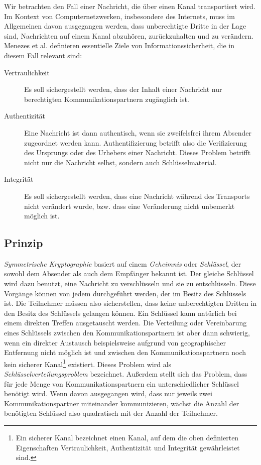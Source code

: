 Wir betrachten den Fall einer Nachricht, die über einen Kanal
transportiert wird. Im Kontext von Computernetzwerken, insbesondere
des Internets, muss im Allgemeinen davon ausgegangen werden, dass
unberechtigte Dritte in der Lage sind, Nachrichten auf einem Kanal
abzuhören, zurückzuhalten und zu verändern. \pagebreak[1] Menezes et
al. \cite{Menezes1996} definieren essentielle Ziele von
Informationssicherheit, die in diesem Fall relevant sind:\
\begin{description}
\item[Vertraulichkeit] Es soll sichergestellt werden, dass der Inhalt
  einer Nachricht nur berechtigten Kommunikationspartnern zugänglich
  ist.
\item[Authentizität] Eine Nachricht ist dann authentisch, wenn sie
  zweifelsfrei ihrem Absender zugeordnet werden
  kann. Authentifizierung betrifft also die Verifizierung des
  Ursprungs oder des Urhebers einer Nachricht. Dieses Problem betrifft
  nicht nur die Nachricht selbst, sondern auch Schlüsselmaterial.
\item[Integrität] Es soll sichergestellt werden, dass eine Nachricht
  während des Transports nicht verändert wurde, bzw. dass eine
  Veränderung nicht unbemerkt möglich ist.
\end{description}

\subsection{Prinzip}
\label{ch:Grundlagen:sec:PublicKeyCrypto:subsec:Prinzip}

\emph{Symmetrische Kryptographie} basiert auf einem \emph{Geheimnis}
oder \emph{Schlüssel}, der sowohl dem Absender als auch dem
Empfänger bekannt ist. Der gleiche Schlüssel wird dazu benutzt,
eine Nachricht zu verschlüsseln und sie zu entschlüsseln. Diese
Vorgänge können von jedem durchgeführt werden, der im Besitz des
Schlüssels ist.  Die Teilnehmer müssen also sicherstellen, dass
keine unberechtigten Dritten in den Besitz des Schlüssels gelangen
können. Ein Schlüssel kann natürlich bei einem direkten Treffen
ausgetauscht werden. Die Verteilung oder Vereinbarung eines
Schlüssels zwischen den Kommunikationspartnern ist aber dann
schwierig, wenn ein direkter Austausch beispielsweise aufgrund von
geographischer Entfernung nicht möglich ist und zwischen den
Kommunikationspartnern noch kein sicherer Kanal\footnote{Ein sicherer
  Kanal bezeichnet einen Kanal, auf dem die oben definierten
  Eigenschaften Vertraulichkeit, Authentizität und Integrität
  gewährleistet sind.} existiert. Dieses Problem wird als
\emph{Schlüsselverteilungsproblem} bezeichnet\cite{Menezes1996}.
Außerdem stellt sich das Problem, dass für jede Menge von
Kommunikationspartnern ein unterschiedlicher Schlüssel benötigt
wird. Wenn davon ausgegangen wird, dass nur jeweils zwei
Kommunikationspartner miteinander kommunizieren, wächst die Anzahl
der benötigten Schlüssel also quadratisch mit der Anzahl der
Teilnehmer.

